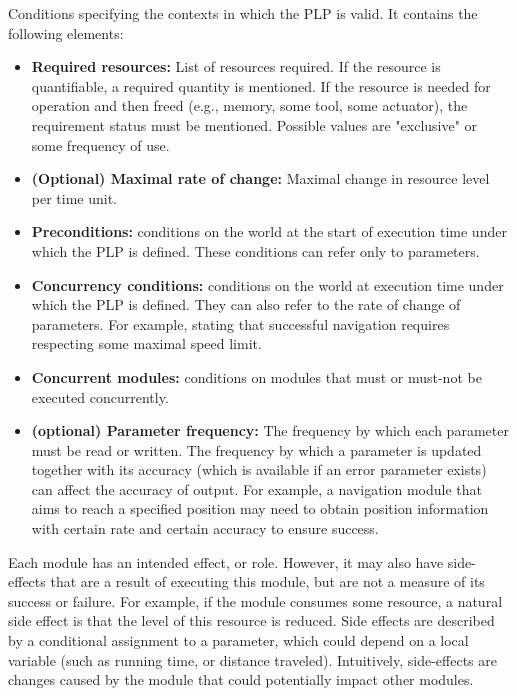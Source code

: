 \documentclass[ 5p, 12pt, times, twocolumn, sort&compress ]{elsarticle}
\begin{document}
 Conditions specifying the contexts in which the PLP is valid. It contains
the following elements:
\begin{itemize}
\item {\bf Required resources:} List of resources required. If the resource is quantifiable, a required quantity is mentioned.
If the resource is needed for operation and then freed (e.g., memory, some tool, some actuator), the requirement status must
be mentioned. Possible values are "exclusive" or some frequency of use.
\item {\bf (Optional) Maximal rate of change:} Maximal change in resource level per time unit.
\item {\bf Preconditions:} conditions on the world at the start of execution time under which the PLP is defined. These conditions can refer only to parameters.
\item {\bf Concurrency conditions:} conditions on the world at execution time under which the PLP is defined. 
They can also refer to the rate of change of parameters. For example, stating that successful
navigation requires respecting some maximal speed limit.
\item  {\bf Concurrent modules:} conditions on modules that must or must-not be executed concurrently.
\item  {\bf (optional) Parameter frequency:} The frequency by which each parameter must be read or written. 
The frequency by which a parameter is updated together with its accuracy (which is available if an error parameter exists)
can affect the accuracy of output. For example, a navigation module that aims to reach a specified position may need to obtain position information with certain rate and certain accuracy to ensure success.
\end{itemize}

 Each module has an intended effect, or role. However, it may also have side-effects that are a result of executing this module, but are not a measure of its success or failure. For example, if the module consumes some resource, a natural side effect is that the level of this resource 
is reduced. Side effects are described by a conditional assignment to a parameter, which could depend on a local variable (such as running time, or distance traveled). Intuitively, side-effects are changes caused by the module that could potentially impact other modules.
\end{document}

